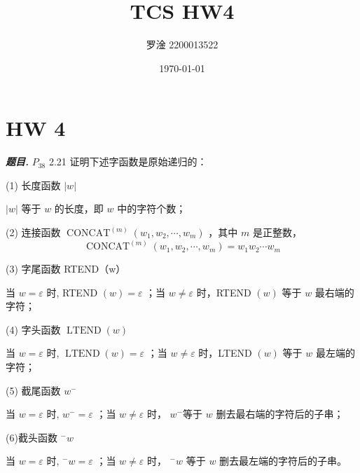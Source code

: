 \documentclass[10pt, a4paper, oneside]{ctexart}
\title{\textbf{TCS HW4}}
\author{罗淦 2200013522}
\date{\today}
\newenvironment{problem}{\begin{framed}\par\noindent\textbf{\textit{题目. }}}{\end{framed}\par}
\begin{document}
\maketitle


\section{HW 4}


\begin{problem}
    $P_{38}$ 2.21 证明下述字函数是原始递归的：

(1) 长度函数 $|w|$

$|w|$ 等于 $w$ 的长度，即 $w$ 中的字符个数；

(2) 连接函数 $\operatorname{CONCAT}^{(m)}\left(w_1, w_2, \cdots, w_m\right)$ ，其中 $m$ 是正整数，
$$
\operatorname{CONCAT}^{(m)}\left(w_1, w_2, \cdots, w_m\right)=w_1 w_2 \cdots w_m
$$

(3) 字尾函数 RTEND（w）

当 $w=\varepsilon$ 时, RTEND $(w)=\varepsilon$ ；当 $w \neq \varepsilon$ 时，RTEND $(w)$ 等于 $w$ 最右端的字符；

(4) 字头函数 $\operatorname{LTEND}(w)$

当 $w=\varepsilon$ 时, $\operatorname{LTEND}(w)=\varepsilon$ ；当 $w \neq \varepsilon$ 时，LTEND $(w)$ 等于 $w$ 最左端的字符；

(5) 截尾函数 $w^{-}$

当 $w=\varepsilon$ 时, $w^{-}=\varepsilon$ ；当 $w \neq \varepsilon$ 时， $w^{-}$等于 $w$ 删去最右端的字符后的子串；

(6)截头函数 $^-w$

当 $w=\varepsilon$ 时, $^-w=\varepsilon$ ；当 $w \neq \varepsilon$ 时， $^-w$ 等于 $w$ 删去最左端的字符后的子串。
\end{problem}
\end{document}
